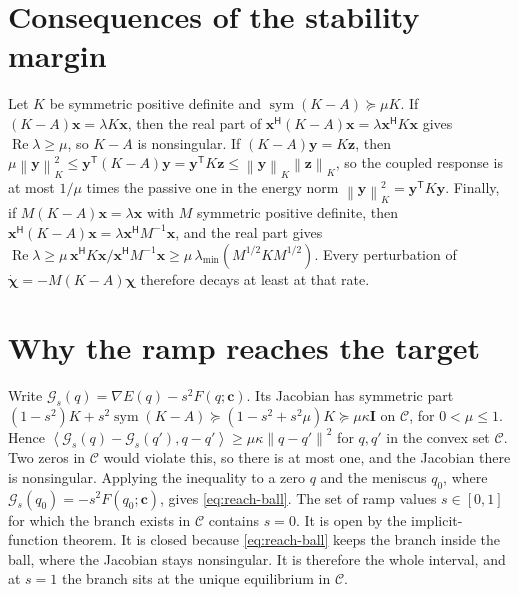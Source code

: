 \documentclass[11pt,a4paper]{article}
\numberwithin{equation}{section}
\newcommand{\Id}{\bm I}
\newcommand{\norm}[1]{\left\lVert#1\right\rVert}
\newcommand{\inner}[2]{\left\langle#1,#2\right\rangle}
\DeclareMathOperator{\Rea}{Re}
\DeclareMathOperator{\sym}{sym}
\begin{document}
\section{Consequences of the stability margin}\label{app:margin}
Let $K$ be symmetric positive definite and $\sym(K-A)\succeq\mu K$. If
$(K-A)\bm x=\lambda K\bm x$, then the real part of
$\bm x^{\mathsf H}(K-A)\bm x=\lambda\bm x^{\mathsf H}K\bm x$ gives
$\Rea\lambda\ge\mu$, so $K-A$ is nonsingular. If $(K-A)\bm y=K\bm z$, then
$\mu\norm{\bm y}_K^2\le\bm y^{\mathsf T}(K-A)\bm y=\bm y^{\mathsf T}K\bm z\le
\norm{\bm y}_K\norm{\bm z}_K$, so the coupled response is at most $1/\mu$ times
the passive one in the energy norm $\norm{\bm y}_K^2=\bm y^{\mathsf T}K\bm y$.
Finally, if $M(K-A)\bm x=\lambda\bm x$ with $M$ symmetric positive definite,
then $\bm x^{\mathsf H}(K-A)\bm x=\lambda\bm x^{\mathsf H}M^{-1}\bm x$, and the
real part gives
$\Rea\lambda\ge\mu\,\bm x^{\mathsf H}K\bm x/\bm x^{\mathsf H}M^{-1}\bm x
\ge\mu\,\lambda_{\min}(M^{1/2}KM^{1/2})$. Every perturbation of
$\dot{\bm\chi}=-M(K-A)\bm\chi$ therefore decays at least at that rate.

\section{Why the ramp reaches the target}\label{app:reach}
Write $\mathcal G_s(q)=\nabla E(q)-s^2F(q;\bm c)$. Its Jacobian has symmetric part
$(1-s^2)K+s^2\sym(K-A)\succeq(1-s^2+s^2\mu)K\succeq\mu\kappa\Id$ on
$\mathcal C$, for $0<\mu\le1$. Hence
$\inner{\mathcal G_s(q)-\mathcal G_s(q')}{q-q'}\ge\mu\kappa\norm{q-q'}^2$ for
$q,q'$ in the convex set $\mathcal C$. Two zeros in $\mathcal C$ would violate
this, so there is at most one, and the Jacobian there is nonsingular. Applying
the inequality to a zero $q$ and the meniscus $q_0$, where
$\mathcal G_s(q_0)=-s^2F(q_0;\bm c)$, gives \cref{eq:reach-ball}. The set of ramp
values $s\in[0,1]$ for which the branch exists in $\mathcal C$ contains $s=0$. It
is open by the implicit-function theorem. It is closed because
\cref{eq:reach-ball} keeps the branch inside the ball, where the Jacobian stays
nonsingular. It is therefore the whole interval, and at $s=1$ the branch sits at
the unique equilibrium in $\mathcal C$.

\clearpage
\printbibliography[heading=bibintoc,title={References}]
\end{document}
